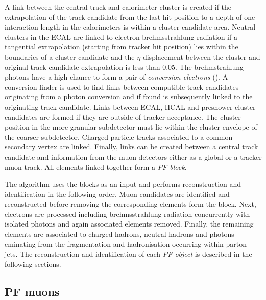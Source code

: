 A link between the central track and calorimeter cluster is created if the extrapolation of the track candidate from the last hit position to a depth of one interaction length in the calorimeters is within a cluster candidate area. 
Neutral clusters in the ECAL are linked to electron brehmsstrahlung radiation if a tangential extrapolation (starting from tracker hit position) lies within the boundaries of a cluster candidate and the $\eta$ displacement between the cluster and original track candidate extrapolation is less than 0.05.
The brehmstrahlung photons have a high chance to form a pair of \textit{conversion electrons} (\electronp{}\electronm{}).
A conversion finder 
is used to find links between compatible track candidates originating from a photon conversion and if found is subsequently linked to the originating track candidate.
Links between ECAL, HCAL and preshower cluster candidates are formed if they are outside of tracker acceptance.
The cluster position in the more granular subdetector must lie within the cluster envelope of the coarser subdetector.
Charged particle tracks associated to a common secondary vertex are linked.
Finally, links can be created between a central track candidate and information from the muon detectors either as a global or a tracker muon track. 
All \PF{} elements linked together form a \textit{PF block}.

The \PF{} algorithm uses the \PF{} blocks as an input and performs reconstruction and identification in the following order.
Muon candidates are identified and reconstructed before removing the corresponding \PF{} elements form the \PF{} block.
Next, electrons are processed including brehmsstrahlung radiation concurrently with isolated photons and again associated \PF{} elements removed.
Finally, the remaining \PF{} elements are associated to charged hadrons, neutral hadrons and photons eminating from the fragmentation and hadronisation occurring within parton jets.
The reconstruction and identification of each \textit{PF object} is described in the following sections.


\subsection{PF muons} %
\label{sub:pf_muons}

